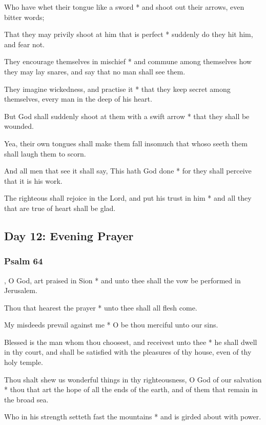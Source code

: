 Who have whet their tongue like a sword * and shoot out their arrows, even bitter words;

That they may privily shoot at him that is perfect * suddenly do they hit him, and fear not.

They encourage themselves in mischief * and commune among themselves how they may lay snares, and say that no man shall see them.

They imagine wickedness, and practise it * that they keep secret among themselves, every man in the deep of his heart.

But God shall suddenly shoot at them with a swift arrow * that they shall be wounded.

Yea, their own tongues shall make them fall insomuch that whoso seeth them shall laugh them to scorn.

And all men that see it shall say, This hath God done * for they shall perceive that it is his work.

The righteous shall rejoice in the Lord, and put his trust in him * and all they that are true of heart shall be glad.

\subsection{Day 12: Evening Prayer}

\subsubsection{Psalm 64}


, O God, art praised in Sion * and unto thee shall the vow be performed in Jerusalem.

Thou that hearest the prayer * unto thee shall all flesh come.

My misdeeds prevail against me * O be thou merciful unto our sins.

Blessed is the man whom thou choosest, and receivest unto thee * he shall dwell in thy court, and shall be satisfied with the pleasures of thy house, even of thy holy temple.

Thou shalt shew us wonderful things in thy righteousness, O God of our salvation * thou that art the hope of all the ends of the earth, and of them that remain in the broad sea.

Who in his strength setteth fast the mountains * and is girded about with power.


